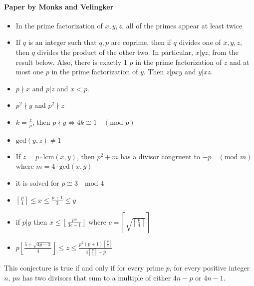 \documentclass[10pt,letter]{article}
\begin{document}
\paragraph{Paper by Monks and Velingker}
\begin{itemize}
    \item In the prime factorization of $x,y,z$, all of the primes appear at least twice 
    \item If $q$ is an integer such that $q,p$ are coprime, then if $q$ divides one of $x,y,z$, then $q$ divides the product of the other two. In particular, $x|yz$, from the result below. Also, there is exactly 1 $p$ in the prime factorization of $z$ and at most one $p$ in the prime factorization of $y$. Then $z|pxy$ and $y|xz$. 
    \item $p\nmid x$ and $p|z$ and $x<p$. 
    \item $p^2\nmid y$ and $p^2\nmid z$
    \item $k=\frac{z}{p}$, then $p\nmid y\Leftrightarrow 4k\cong1\quad(\text{mod }p)$ 
    \item $\text{gcd}(y,z)\neq1$
    \item If $z=p\cdot\text{lcm}(x,y)$, then $p^2+m$ has a divisor congruent to $-p\quad(\text{mod }m)$ where $m=4\cdot\text{gcd}(x,y)$
    \item it is solved for $p\cong3\quad \text{mod 4}$ 
    \item $\left\lceil\frac{p}{4}\right\rceil\leq x\leq\frac{p+1}{3}\leq y$ 
    \item if $p|y$ then $x\leq \left\lfloor\frac{pc}{3c-1}\right\rfloor$ where $c=\left\lceil\sqrt{\left\lceil\frac{p}{4}\right\rceil}\right\rceil$ 
    \item $p\left\lfloor\frac{5+\sqrt{4p-3}}{4}\right\rfloor\leq z\leq\frac{p^2(p+1)\left\lceil\frac{p}{4}\right\rceil}{4\left\lceil\frac{p}{4}\right\rceil-p}$
\end{itemize}
This conjecture is true if and only if for every prime $p$, for every positive integer $n$, $pn$ has two divisors that sum to a multiple of either $4n-p$ or $4n-1$. \\ 
\end{document}
